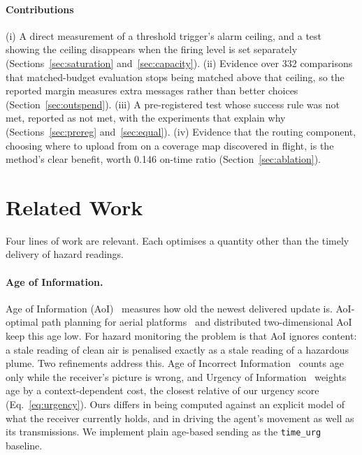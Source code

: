 \documentclass[pdflatex,sn-mathphys-num,iicol]{sn-jnl}
\theoremstyle{thmstyleone}
\theoremstyle{thmstyletwo}
\theoremstyle{thmstylethree}
\begin{document}
\paragraph{Contributions} (i) A direct measurement of a threshold trigger's alarm ceiling,
and a test showing the ceiling disappears when the firing level is set separately
(Sections~\ref{sec:saturation} and~\ref{sec:capacity}). (ii) Evidence over 332
comparisons that matched-budget evaluation stops being matched above that ceiling, so the
reported margin measures extra messages rather than better choices
(Section~\ref{sec:outspend}). (iii) A pre-registered test whose success rule was not met,
reported as not met, with the experiments that explain why (Sections~\ref{sec:prereg}
and~\ref{sec:equal}). (iv) Evidence that the routing component, choosing where to upload
from on a coverage map discovered in flight, is the method's clear benefit, worth 0.146
on-time ratio (Section~\ref{sec:ablation}).

\section{Related Work}\label{sec:related}

Four lines of work are relevant. Each optimises a quantity other than the timely delivery
of hazard readings.

\paragraph{Age of Information.} Age of Information (AoI)~\cite{kaulRealTimeStatus2012}
measures how old the newest delivered update is. AoI-optimal path planning for aerial
platforms~\cite{xieAoIoptimalPathPlanning2025, AoIOptimalMultiAAVEnabledISAC} and
distributed two-dimensional AoI~\cite{fidler2DAoIAgeofInformationDistributed2026} keep
this age low. For hazard monitoring the problem is that AoI ignores content: a stale
reading of clean air is penalised exactly as a stale reading of a hazardous plume. Two refinements
address this. Age of Incorrect Information~\cite{maatoukAgeIncorrectInformation2020}
counts age only while the receiver's picture is wrong, and Urgency of
Information~\cite{zhengUrgencyOfInformation2020} weights age by a context-dependent cost,
the closest relative of our urgency score (Eq.~\eqref{eq:urgency}). Ours differs in being
computed against an explicit model of what the receiver currently holds, and in driving
the agent's movement as well as its transmissions. We implement plain age-based sending as
the \texttt{time\_urg} baseline.
\end{document}
